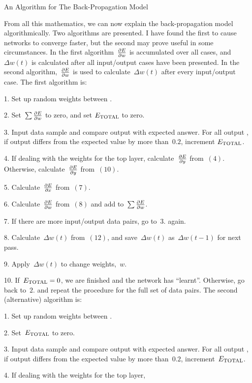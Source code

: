 \sec An Algorithm for The Back-Propagation Model

From all this mathematics, we can now explain the back-propagation model
algorithmically.
Two algorithms are presented.
I have found the first to cause networks to converge faster, but the
second may prove useful in some circumstances.
In the first algorithm~$\partial E \over \partial w$ is 
accumulated over all cases, and~$\Delta w(t)$ is calculated after
all input/output cases have been presented.
In the second algorithm,~$\partial E \over \partial w$ is
used to calculate~$\Delta w(t)$ after every input/output case.
\bigskip\noindent
The first algorithm is:
\smallskip
\item {1.} Set up random weights between \neus.
\item {2.} Set~$\sum {\partial E \over \partial w}$ to zero, and
set $E_{\rm TOTAL}$ to zero.
\item {3.} Input data sample and compare output with expected answer.
For all output \neus, if output differs from the expected value by
more than~$0.2$, increment $E_{\rm TOTAL}$.
\item {4.} If dealing with the weights for the top layer,
calculate~$\partial E \over \partial y$ from~$(4)$. Otherwise,
calculate~$\partial E \over \partial y$ from~$(10)$.
\item {5.} Calculate~$\partial E \over \partial x$ from~$(7)$.
\item {6.} Calculate~$\partial E \over \partial w$ from~$(8)$ and
add to~$\sum {\partial E \over \partial w}$.
\item {7.} If there are more input/output data pairs, go to~$3.$
again.
\item {8.} Calculate~$\Delta w(t)$ from~$(12)$, and save~$\Delta
w(t)$ as~$\Delta w(t-1)$ for next pass.
\item {9.} Apply~$\Delta w(t)$ to change weights,~$w$.
\item {10.} If~$E_{\rm TOTAL} = 0$, we are finished and the network
has ``learnt''.
Otherwise, go back to~$2.$ and repeat the procedure for the full set
of data pairs.
\bigskip\noindent
The second (alternative) algorithm is:
\smallskip
\item {1.} Set up random weights between \neus.
\item {2.} Set~$E_{\rm TOTAL}$ to zero.
\item {3.} Input data sample and compare output with expected answer.
For all output \neus, if output differs from the expected value by
more than~$0.2$, increment~$E_{\rm TOTAL}$.
\item {4.} If dealing with the weights for the top layer,
